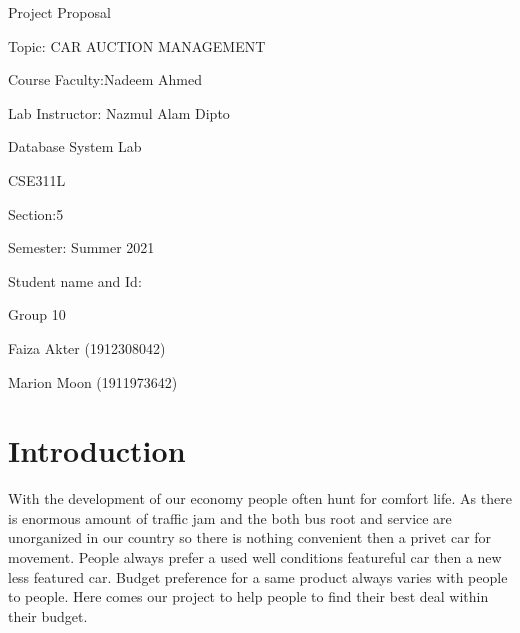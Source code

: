 \documentclass{report}
\begin{document}
\begin{titlepage}
\vspace{4\baselineskip}

{\large Project Proposal}
\vspace{4.5\baselineskip}

{\Large Topic: CAR AUCTION MANAGEMENT   }
	\vspace{2.5\baselineskip}
	
	{\Large Course Faculty:Nadeem Ahmed }
	\vspace{0.5\baselineskip}
	
	
{\Large Lab Instructor: Nazmul Alam Dipto }
	\vspace{4.5\baselineskip}


{\Large Database System Lab     \vspace{0.5\baselineskip}
		
		CSE311L \vspace{0.5\baselineskip}
		
		Section:5 \vspace{0.5\baselineskip}
		
		Semester: Summer 2021 \vspace{0.5\baselineskip} }
		\vspace{4.5\baselineskip}
		
{\Large Student name and Id:     \vspace{0.5\baselineskip}
		
		Group 10 \vspace{0.5\baselineskip}
		}
		
{\Large Faiza Akter (1912308042) \vspace{0.5\baselineskip}
		
		Marion Moon (1911973642)\vspace{0.5\baselineskip}
		}
		
\end{titlepage}	

\section*{Introduction}
With the development of our economy people often hunt for comfort life. As there is enormous amount of traffic jam and the both bus root and service are unorganized in our country so there is nothing convenient then a privet car for movement. People always prefer a used well conditions featureful car then a new less featured car. Budget preference for a same product always varies with people to people. Here comes our project to help people to find their best deal within their budget.
\end{document}

